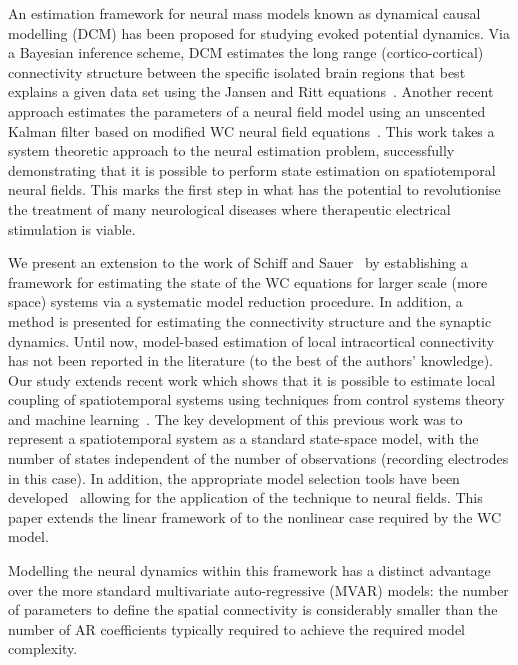 \documentclass[12pt]{iopart}
\begin{document}

An estimation framework for neural mass models known as dynamical causal modelling (DCM) \cite{David2003,David2006} has been proposed for studying evoked potential dynamics. Via a Bayesian inference scheme, DCM estimates the long range (cortico-cortical) connectivity structure between the specific isolated brain regions that best explains a given data set using the Jansen and Ritt equations~\cite{Jansen1995}. Another recent approach estimates the parameters of a neural field model using an unscented Kalman filter based on modified WC neural field equations~\cite{schiff2008kalman}. This work takes a system theoretic approach to the neural estimation problem, successfully demonstrating that it is possible to perform state estimation on spatiotemporal neural fields. This marks the first step in what has the potential to revolutionise the treatment of many neurological diseases where therapeutic electrical stimulation is viable.

We present an extension to the work of Schiff and Sauer~\cite{schiff2008kalman} by establishing a framework for estimating the state of the WC equations for larger scale (more space) systems via a systematic model reduction procedure. In addition, a method is presented for estimating the connectivity structure and the synaptic dynamics. Until now, model-based estimation of local intracortical connectivity has not been reported in the literature (to the best of the authors' knowledge). Our study extends recent work which shows that it is possible to estimate local coupling of spatiotemporal systems using techniques from control systems theory and machine learning~\cite{Dewar2009}. The key development of this previous work was to represent a spatiotemporal system as a standard state-space model, with the number of states independent of the number of observations (recording electrodes in this case). In addition, the appropriate model selection tools have been developed~\cite{Scerri2009} allowing for the application of the technique to neural fields. This paper extends the linear framework of \cite{Dewar2009,Scerri2009} to the nonlinear case required by the WC model. 

Modelling the neural dynamics within this framework has a distinct advantage over the more standard multivariate auto-regressive (MVAR) models: the number of parameters to define the spatial connectivity is considerably smaller than the number of AR coefficients typically required to achieve the required model complexity. 
\end{document}
